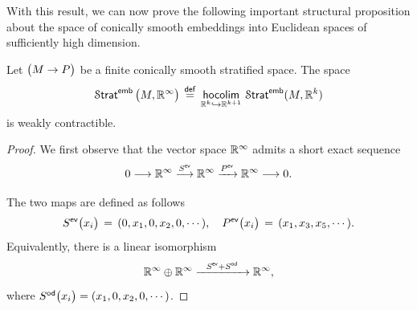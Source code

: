 With this result, we can now prove the following important structural proposition about the space of conically smooth embeddings into Euclidean spaces of sufficiently high dimension.

\begin{proposition} \label{ch4:: prop: contractibility of embeddings}
    Let $\big(M \rightarrow P\big)$ be a finite conically smooth stratified space. The space 
    \begin{equation}
        \Strat^{\sf emb}\big(M, \RR^{\oo}\big) \, \overset{\sf def}{=} \, \hoColimit[\RR^{k}\hookra \RR^{k+1}] \Strat^{\sf emb}(M, \RR^{k})
    \end{equation} 
    is weakly contractible.
\end{proposition}

\begin{proof}
We first observe that the vector space $\mathbb R^{\operatorname{\infty}}$ admits a short exact sequence 
\begin{equation}
    0 \longrightarrow \mathbb R^{\operatorname{\infty}} \stackrel{S^{\sf ev}}{\longrightarrow} \mathbb R^{\operatorname{\infty}} \xrightarrow{P^{\sf ev}} \mathbb R^{\operatorname{\infty}} \longrightarrow 0.
\end{equation}

\noindent The two maps are defined as follows 
\begin{equation}
    S^{\sf ev}\big(x_i\big) \, = \, (0,x_1, 0,x_2, 0, \cdots), \quad P^{\sf ev}\big(x_i\big) \, = \, (x_1, x_3, x_5, \cdots).
\end{equation}
Equivalently, there is a linear isomorphism 
\begin{equation}
    \mathbb R^{\operatorname{\infty}} \oplus \mathbb R^{\operatorname{\infty}} \xrightarrow{\,\,\,\,\,S^{\sf ev} + S^{\sf od}\,\,\,\,\,} \mathbb R^{\operatorname{\infty}},
\end{equation}
where $S^{\sf od}\big(x_i\big) = (x_1, 0, x_2, 0, \cdots)$.  


\end{proof}
